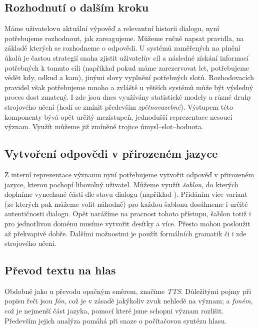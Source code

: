 \subsection{Rozhodnutí o dalším kroku}

Máme uživatelovu aktuální výpověď a relevantní historii dialogu, nyní potřebujeme
rozhodnout, jak zareagujeme. Můžeme ručně napsat pravidla, na základě kterých
se rozhodneme o odpovědi. U systémů zaměřených na plnění úkolů je častou
strategií snaha zjistit uživatelův cíl a následné získání informací potřebných
k tomuto cíli (například pokud máme zarezervovat let, potřebujeme vědět kdy,
odkud a kam), jinými slovy vyplnění potřebných slotů. Rozhodovacích pravidel
však potřebujeme mnoho a zvláště u větších systémů může být výsledný proces dost
zmatený. I zde jsou dnes využívány statistické modely a různé druhy strojového
učení (hodí se zmínit především \textit{zpětnovazebné}). Výstupem této komponenty
bývá opět určitý mezistupeň, jednodušší reprezentace nesoucí význam. Využít
můžeme již zmíněné trojice úmysl--slot--hodnota.

\subsection{Vytvoření odpovědi v přirozeném jazyce}

Z interní reprezentace významu nyní potřebujeme vytvořit odpověď v přirozeném
jazyce, kterou pochopí libovolný uživatel. Můžeme využít \textit{šablon}, do
kterých doplníme vynechané části dle stavu dialogu (například
). Přidáním více variant (ze kterých
pak můžeme volit náhodně) pro každou šablonu dosáhneme i určité autentičnosti
dialogu. Opět narážíme na pracnost tohoto přístupu, šablon totiž i pro
jednotlivou doménu musíme vytvořit desítky a více. Přesto mohou posloužit až
překvapivě dobře. Dalšími možnostmi je použít formálních gramatik či i zde
strojového učení.

\subsection{Převod textu na hlas}

Obdobně jako u převodu opačným směrem, značíme \textit{TTS}. Důležitými pojmy
při popisu řeči jsou \textit{fón}, což je v zásadě jakýkoliv zvuk nehledě na
význam; a \textit{foném}, což je nejmenší část jazyka,
pomocí které jsme schopni význam rozlišit. Především jejich analýza pomáhá
při snaze o počítačovou syntézu hlasu.

